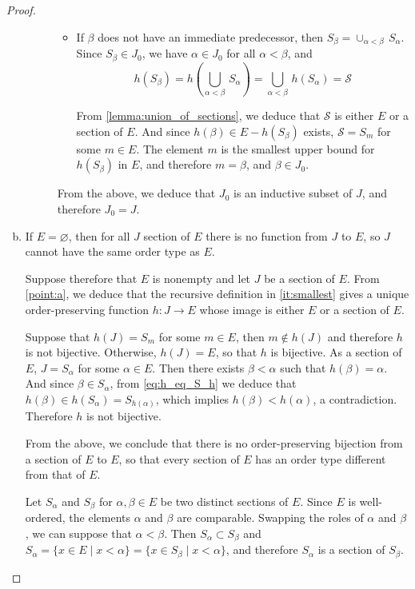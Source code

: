 \documentclass[11pt,a4paper,twoside]{article}
\theoremstyle{definition}
\begin{document}
\begin{proof}
\begin{enumerate}[(a)]
\begin{description}
\begin{itemize}
      \item If $\beta$ does not have an immediate predecessor, then $S_\beta = \cup_{\alpha < \beta} \,S_\alpha$. Since $S_\beta \in J_0$,
        we have $\alpha \in J_0$ for all $\alpha < \beta$, and
        \begin{equation*}
          h ( S_\beta ) = h \left( \bigcup_{\alpha < \beta} \,S_\alpha \right) = \bigcup_{\alpha < \beta} \,h ( S_\alpha ) = \mathscr{S}
        \end{equation*}

        From \cref{lemma:union_of_sections}, we deduce that $\mathscr{S}$ is either $E$ or a section of $E$. And since
        $h ( \beta ) \in E - h ( S_\beta )$ exists, $\mathscr{S} = S_m$ for some $m \in E$. The element $m$ is the smallest
        upper bound for $h ( S_\beta )$ in $E$, and therefore $m = \beta$, and $\beta \in J_0$.

      \end{itemize}
      From the above, we deduce that $J_0$ is an inductive subset of $J$, and therefore $J_0 = J$.

    \end{description}

  \item If $E = \varnothing$, then for all $J$ section of $E$ there is no function from $J$ to $E$, so $J$ cannot have the
    same order type as $E$.

    Suppose therefore that $E$ is nonempty and let $J$ be a section of $E$. From \cref{point:a}, we deduce that
    the recursive definition in \ref{it:smallest} gives a unique order-preserving function $h : J \to E$ whose image is
    either $E$ or a section of $E$.

    Suppose that $h ( J ) = S_m$ for some $m \in E$, then $m \notin h ( J )$ and therefore $h$ is not bijective.
    Otherwise, $h ( J ) = E$, so that $h$ is bijective. As a section of $E$, $J = S_\alpha$ for some $\alpha \in E$.
    Then there exists $\beta < \alpha$ such that $h ( \beta ) = \alpha$. And since $\beta \in S_\alpha$, from \eqref{eq:h_eq_S_h}
    we deduce that $h ( \beta ) \in h ( S_\alpha ) = S_{ h ( \alpha ) }$, which implies $h ( \beta ) < h ( \alpha )$,
    a contradiction. Therefore $h$ is not bijective.

    From the above, we conclude that there is no order-preserving bijection from a section of $E$ to $E$, so that
    every section of $E$ has an order type different from that of $E$.

    Let $S_\alpha$ and $S_\beta$ for $\alpha, \beta \in E$ be two distinct sections of $E$. Since $E$ is well-ordered,
    the elements $\alpha$ and $\beta$ are comparable. Swapping the roles of $\alpha$ and $\beta$, we can suppose that
    $\alpha < \beta$. Then $S_\alpha \subset S_\beta$ and $S_\alpha = \{ x \in E \mid x < \alpha \} = \{ x \in S_\beta \mid x < \alpha \}$,
    and therefore $S_\alpha$ is a section of $S_\beta$.


\end{enumerate}
\end{proof}
\end{document}
